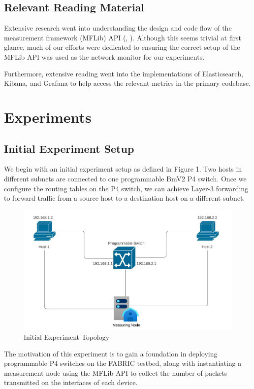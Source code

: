 \documentclass[conference]{IEEEtran}
\begin{document}
    \subsection{Relevant Reading Material}
    Extensive research went into understanding the design and code flow of the measurement framework (MFLib) API (\cite{b3}, \cite{b4}). Although this seems trivial at first glance, much of our efforts were dedicated to ensuring the correct setup of the MFLib API was used as the network monitor for our experiments.

    Furthermore, extensive reading went into the implementations of Elasticsearch, Kibana, and Grafana to help access the relevant metrics in the primary codebase.
    
    \section{Experiments}
    \subsection{Initial Experiment Setup} 
    We begin with an initial experiment setup as defined in Figure 1. Two hosts in different subnets are connected to one programmable BmV2 P4 switch. Once we configure the routing tables on the P4 switch, we can achieve Layer-3 forwarding to forward traffic from a source host to a destination host on a different subnet. 
    \begin{figure}[h!]
        \includegraphics[scale=0.355]{Initial_Switch_Topology.jpeg}
        \centering
        \caption{Initial Experiment Topology}
    \end{figure}
    The motivation of this experiment is to gain a foundation in deploying programmable P4 switches on the FABRIC testbed, along with instantiating a measurement node using the MFLib API to collect the number of packets transmitted on the interfaces of each device. 
\end{document}
